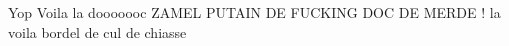 Yop Voila la dooooooc Z\+A\+M\+EL P\+U\+T\+A\+IN DE F\+U\+C\+K\+I\+NG D\+OC DE M\+E\+R\+DE ! la voila bordel de cul de chiasse 